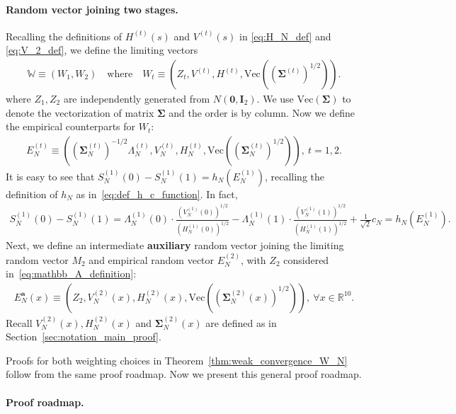 \documentclass[12pt]{article}
\begin{document}
\paragraph{Random vector joining two stages.}

Recalling the definitions of $H^{(t)}(s)$ and $V^{(t)}(s)$ in \eqref{eq:H_N_def} and \eqref{eq:V_2_def}, we define the limiting vectors
\begin{align}\label{eq:mathbb_A_definition}
	\mathbb{W}\equiv (W_1,W_2)\quad\text{where}\quad  W_t\equiv (Z_t ,V^{(t)},H^{(t)}, \mathrm{Vec} ( (\bm\Sigma^{(t)})^{1/2})).
\end{align} 
where $Z_1,Z_2$ are independently generated from $ N(\bm 0,\bm I_2)$. We use $\mathrm{Vec}(\bm\Sigma)$ to denote the vectorization of matrix $\bm\Sigma$ and the order is by column. Now we define the empirical counterparts for $W_t$:
\begin{align}\label{eq:E_N_t_def}
	E_{N}^{(t)}\equiv \left((\bm \Sigma_N^{(t)})^{-1/2}\Lambda_{N}^{(t)}, V_N^{(t)},H_N^{(t)},\mathrm{Vec}((\bm \Sigma_N^{(t)})^{1/2})\right),\ t=1,2.
\end{align}
It is easy to see that $S_N^{(1)}(0)-S_N^{(1)}(1)=h_N(E_N^{(1)})$, recalling the definition of $h_N$ as in~\eqref{eq:def_h_c_function}. In fact,
\begin{align*}
	S_N^{(1)}(0)-S_N^{(1)}(1)=\Lambda_{N}^{(1)}(0)\cdot \frac{(V_{N}^{(1)}(0))^{1/2}}{(H_N^{(1)}(0))^{1/2}}-\Lambda_{N}^{(1)}(1)\cdot \frac{(V_{N}^{(1)}(1))^{1/2}}{(H_N^{(1)}(1))^{1/2}}+\frac{1}{\sqrt{2}}c_N=h_N(E_N^{(1)}).
\end{align*}
Next, we define an intermediate \textbf{auxiliary} random vector joining the limiting random vector $M_2$ and empirical random vector $E_N^{(2)}$, with $Z_2$ considered in~\eqref{eq:mathbb_A_definition}:
\begin{align}\label{eq:E_N_a_x}
	E_{N}^{\textbf{a}}(x)\equiv (Z_2, V_N^{(2)}(x),H_N^{(2)}(x), \mathrm{Vec}((\bm \Sigma_N^{(2)}(x))^{1/2})),\ \forall x\in\mathbb{R}^{10}.
\end{align}
Recall $V_N^{(2)}(x),H_N^{(2)}(x)$ and $\bm\Sigma_N^{(2)}(x)$ are defined as in Section~\ref{sec:notation_main_proof}. 

Proofs for both weighting choices in Theorem~\ref{thm:weak_convergence_W_N} follow from the same proof roadmap. Now we present this general proof roadmap.

\paragraph{Proof roadmap.}
\end{document}
